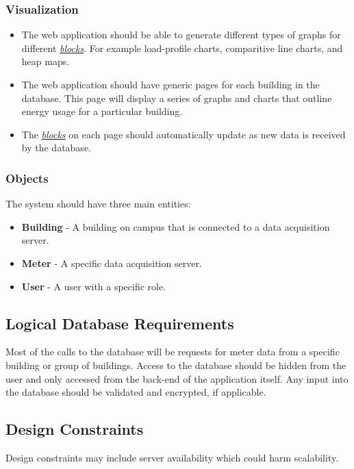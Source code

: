 \documentclass[journal,10pt,onecolumn,compsoc]{IEEEtran}
\begin{document}
    \subsubsection{Visualization}
    \begin{itemize}
        \item The web application should be able to generate different types of graphs for different \hyperref[definition]{\textit{blocks}}. For example load-profile charts, comparitive line charts, and heap maps.
        \item The web application should have generic pages for each building in the database. This page will display a series of graphs and charts that outline energy usage for a particular building.
        \item The \hyperref[definition]{\textit{blocks}} on each page should automatically update as new data is received by the database.
    \end{itemize}
    \subsubsection{Objects}
        The system should have three main entities: 
        \begin{itemize}
            \item \textbf{Building} - A building on campus that is connected to a data acquisition server.
            \item \textbf{Meter} - A specific data acquisition server.
            \item \textbf{User} - A user with a specific role.
        \end{itemize}
        
    \subsection{Logical Database Requirements}
    Most of the calls to the database will be requests for meter data from a specific building or group of buildings. Access to the database should be hidden from the user and only accessed from the back-end of the application itself. Any input into the database should be validated and encrypted, if applicable. 
    
    \subsection{Design Constraints}
    Design constraints may include server availability which could harm scalability.
\end{document}
